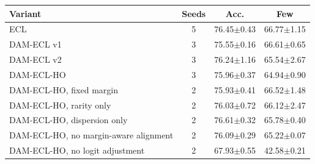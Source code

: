 \begin{tabular}{l c c c}
\toprule
Variant & Seeds & Acc. & Few \\
\midrule
ECL & 5 & 76.45{\scriptsize$\pm$0.43} & 66.77{\scriptsize$\pm$1.15} \\
DAM-ECL v1 & 3 & 75.55{\scriptsize$\pm$0.16} & 66.61{\scriptsize$\pm$0.65} \\
DAM-ECL v2 & 3 & 76.24{\scriptsize$\pm$1.16} & 65.54{\scriptsize$\pm$2.67} \\
DAM-ECL-HO & 3 & 75.96{\scriptsize$\pm$0.37} & 64.94{\scriptsize$\pm$0.90} \\
DAM-ECL-HO, fixed margin & 2 & 75.93{\scriptsize$\pm$0.41} & 66.52{\scriptsize$\pm$1.48} \\
DAM-ECL-HO, rarity only & 2 & 76.03{\scriptsize$\pm$0.72} & 66.12{\scriptsize$\pm$2.47} \\
DAM-ECL-HO, dispersion only & 2 & 76.61{\scriptsize$\pm$0.32} & 65.78{\scriptsize$\pm$0.40} \\
DAM-ECL-HO, no margin-aware alignment & 2 & 76.09{\scriptsize$\pm$0.29} & 65.22{\scriptsize$\pm$0.07} \\
DAM-ECL-HO, no logit adjustment & 2 & 67.93{\scriptsize$\pm$0.55} & 42.58{\scriptsize$\pm$0.21} \\
\bottomrule
\end{tabular}
